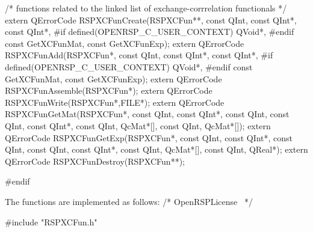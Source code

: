 /* functions related to the linked list of exchange-corrrelation functionals */
extern QErrorCode RSPXCFunCreate(RSPXCFun**,
                                 const QInt,
                                 const QInt*,
                                 const QInt*,
#if defined(OPENRSP_C_USER_CONTEXT)
                                 QVoid*,
#endif
                                 const GetXCFunMat,
                                 const GetXCFunExp);
extern QErrorCode RSPXCFunAdd(RSPXCFun*,
                              const QInt,
                              const QInt*,
                              const QInt*,
#if defined(OPENRSP_C_USER_CONTEXT)
                              QVoid*,
#endif
                              const GetXCFunMat,
                              const GetXCFunExp);
extern QErrorCode RSPXCFunAssemble(RSPXCFun*);
extern QErrorCode RSPXCFunWrite(RSPXCFun*,FILE*);
extern QErrorCode RSPXCFunGetMat(RSPXCFun*,
                                 const QInt,
                                 const QInt*,
                                 const QInt,
                                 const QInt,
                                 const QInt*,
                                 const QInt,
                                 QcMat*[],
                                 const QInt,
                                 QcMat*[]);
extern QErrorCode RSPXCFunGetExp(RSPXCFun*,
                                 const QInt,
                                 const QInt*,
                                 const QInt,
                                 const QInt,
                                 const QInt*,
                                 const QInt,
                                 QcMat*[],
                                 const QInt,
                                 QReal*);
extern QErrorCode RSPXCFunDestroy(RSPXCFun**);

#endif
\nwendcode{}\nwdocspar

The functions are implemented as follows:
\nwenddocs{}\endmoddef
/*
  \LA{}OpenRSPLicense~{\nwtagstyle{}}\RA{}
*/

#include "RSPXCFun.h"

